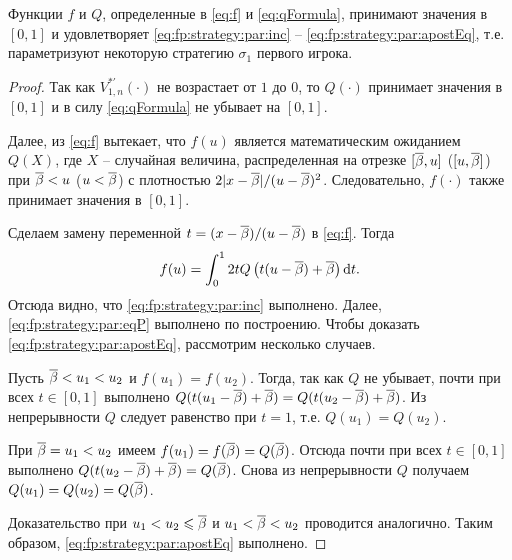 \begin{lemma}
  \label{lemma:fp:fQ:isStrategy}
  Функции $f$ и $Q$\textnormal{,} определенные в \eqref{eq:f} и
  \eqref{eq:qFormula}\textnormal{,} принимают значения в $[0, 1]$ и
  удовлетворяет \eqref{eq:fp:strategy:par:inc} --
  \eqref{eq:fp:strategy:par:apostEq}\textnormal{,} т.е. параметризуют некоторую
  стратегию $\sigma_1$ первого игрока.
\end{lemma}
\begin{proof}
  Так как $V^{*\prime}_{1,n}(\cdot)$ не возрастает от $1$ до $0$, то $Q(\cdot)$
  принимает значения в $[0, 1]$ и в силу \eqref{eq:qFormula} не убывает на $[0,
  1]$.

  Далее, из \eqref{eq:f} вытекает, что $f(u)$ является математическим ожиданием
  $Q(X)$, где $X$ -- случайная величина, распределенная на отрезке $[{\overline{\beta}}, u]$
  ($[u, {\overline{\beta}}]$) при ${\overline{\beta}} < u$ ($u < {\overline{\beta}}$) с плотностью $2|x-{\overline{\beta}}|/(u-{\overline{\beta}})^2$.
  Следовательно, $f(\cdot)$ также принимает значения в $[0, 1]$.

  Сделаем замену переменной $t = (x - {\overline{\beta}})/(u - {\overline{\beta}})$ в \eqref{eq:f}. Тогда
  \begin{equation*}
    f(u) = \int_0^1 2 t Q \left( t(u - {\overline{\beta}}) + {\overline{\beta}} \right) \mathop{}\!\mathrm{d} t.
  \end{equation*}
  Отсюда видно, что \eqref{eq:fp:strategy:par:inc} выполнено. Далее,
  \eqref{eq:fp:strategy:par:eqP} выполнено по построению. Чтобы доказать
  \eqref{eq:fp:strategy:par:apostEq}, рассмотрим несколько случаев.

  Пусть ${\overline{\beta}} < u_1 < u_2$ и $f(u_1) = f(u_2)$. Тогда, так как $Q$ не убывает,
  почти при всех $t \in [0, 1]$ выполнено $ Q(t(u_1 - {\overline{\beta}}) + {\overline{\beta}}) = Q(t(u_2 -
  {\overline{\beta}}) + {\overline{\beta}})$. Из непрерывности $Q$ следует равенство при $t = 1$, т.е.
  $Q(u_1) = Q(u_2)$.

  При ${\overline{\beta}} = u_1 < u_2$ имеем $f(u_1) = f({\overline{\beta}}) = Q({\overline{\beta}})$. Отсюда почти при
  всех $t \in [0, 1]$ выполнено $Q(t(u_2 - {\overline{\beta}}) + {\overline{\beta}}) = Q({\overline{\beta}})$. Снова из
  непрерывности $Q$ получаем $Q(u_1) = Q(u_2) = Q({\overline{\beta}})$.

  Доказательство при $u_1 < u_2 \leqslant {\overline{\beta}}$ и $u_1 < {\overline{\beta}} < u_2$ проводится
  аналогично. Таким образом, \eqref{eq:fp:strategy:par:apostEq} выполнено.
\end{proof}

